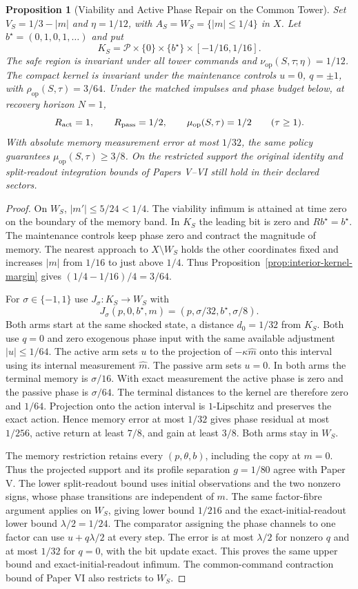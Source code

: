 \documentclass[11pt,a4paper]{article}
\newtheorem{proposition}{Proposition}[section]
\theoremstyle{definition}
\newcommand{\Persist}{\rho_{\mathrm{op}}}
\newcommand{\Maint}{\mu_{\mathrm{op}}}
\newcommand{\Viab}{\nu_{\mathrm{op}}}
\begin{document}
\begin{proposition}[Viability and Active Phase Repair on the Common Tower]\label{prop:common-tower-phase-repair}
Set $V_S=1/3-|m|$ and $\eta=1/12$, with $A_S=W_S=\{|m|\le 1/4\}$ in $X$. Let $b^\star=(0,1,0,1,\ldots)$ and put
\[
 K_S=\mathcal P\times\{0\}\times\{b^\star\}\times[-1/16,1/16].
\]
The safe region is invariant under all tower commands and $\Viab(S,\tau;\eta)=1/12$. The compact kernel is invariant under the maintenance controls $u=0$, $q=\pm1$, with $\Persist(S,\tau)=3/64$. Under the matched impulses and phase budget below, at recovery horizon $N=1$,
\[
 R_{\rm act}=1,\qquad R_{\rm pass}=1/2,\qquad \Maint(S,\tau)=1/2
 \qquad(\tau\ge 1).
\]
With absolute memory measurement error at most $1/32$, the same policy guarantees $\Maint(S,\tau)\ge3/8$. On the restricted support the original identity and split-readout integration bounds of Papers V--VI still hold in their declared sectors.
\end{proposition}
\begin{proof}
On $W_S$, $|m'|\le 5/24<1/4$. The viability infimum is attained at time zero on the boundary of the memory band. In $K_S$ the leading bit is zero and $Rb^\star=b^\star$. The maintenance controls keep phase zero and contract the magnitude of memory. The nearest approach to $X\setminus W_S$ holds the other coordinates fixed and increases $|m|$ from $1/16$ to just above $1/4$. Thus Proposition~\ref{prop:interior-kernel-margin} gives $(1/4-1/16)/4=3/64$.

For $\sigma\in\{-1,1\}$ use $J_\sigma:K_S\to W_S$ with
\[
 J_\sigma(p,0,b^\star,m)=(p,\sigma/32,b^\star,\sigma/8).
\]
Both arms start at the same shocked state, a distance $d_0=1/32$ from $K_S$. Both use $q=0$ and zero exogenous phase input with the same available adjustment $|u|\le1/64$. The active arm sets $u$ to the projection of $-\kappa\widehat m$ onto this interval using its internal measurement $\widehat m$. The passive arm sets $u=0$. In both arms the terminal memory is $\sigma/16$. With exact measurement the active phase is zero and the passive phase is $\sigma/64$. The terminal distances to the kernel are therefore zero and $1/64$. Projection onto the action interval is $1$-Lipschitz and preserves the exact action. Hence memory error at most $1/32$ gives phase residual at most $1/256$, active return at least $7/8$, and gain at least $3/8$. Both arms stay in $W_S$.

The memory restriction retains every $(p,\theta,b)$, including the copy at $m=0$. Thus the projected support and its profile separation $g=1/80$ agree with Paper V. The lower split-readout bound uses initial observations and the two nonzero signs, whose phase transitions are independent of $m$. The same factor-fibre argument applies on $W_S$, giving lower bound $1/216$ and the exact-initial-readout lower bound $\lambda/2=1/24$. The comparator assigning the phase channels to one factor can use $u+q\lambda/2$ at every step. The error is at most $\lambda/2$ for nonzero $q$ and at most $1/32$ for $q=0$, with the bit update exact. This proves the same upper bound and exact-initial-readout infimum. The common-command contraction bound of Paper VI also restricts to $W_S$.
\end{proof}
\end{document}
